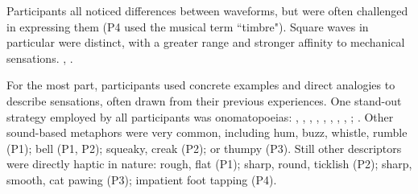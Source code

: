 

Participants all noticed differences between waveforms, but were often challenged in expressing them
(P4 
used the musical term ``timbre").
Square waves in particular were distinct, with a greater range and stronger affinity to mechanical sensations.
	,
	.

For the most part, participants used concrete examples and direct analogies to describe sensations, often drawn from their previous experiences.
One stand-out strategy employed by all participants %
was %
onomatopoeias: , , , , , , , , ; .
Other sound-based metaphors were very common, including hum, buzz, whistle, rumble (P1); bell (P1, P2); squeaky, creak (P2); or thumpy (P3).
Still other descriptors were directly haptic in nature:
rough, flat (P1);
sharp, round, ticklish (P2);
sharp, smooth, cat pawing (P3);
impatient foot tapping (P4).


